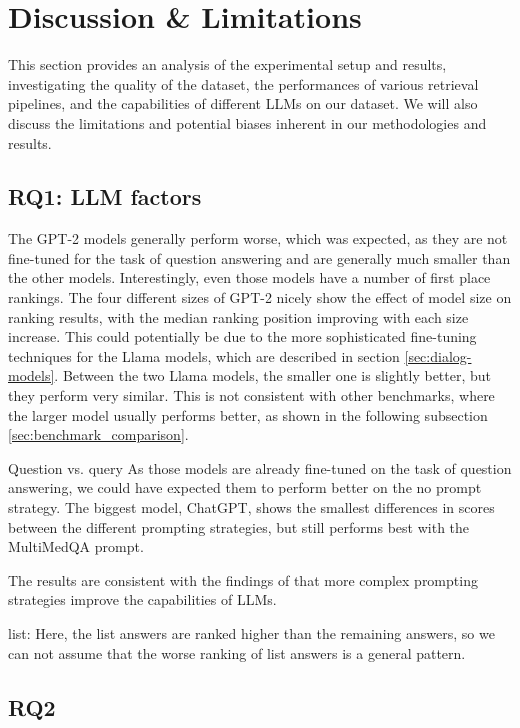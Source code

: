 \chapter{Discussion \& Limitations}\label{discussion}

This section provides an analysis of the experimental setup and results, investigating the quality of the dataset, the performances of various retrieval pipelines, and the capabilities of different LLMs on our dataset.
We will also discuss the limitations and potential biases inherent in our methodologies and results.

\section{RQ1: LLM factors}

The GPT-2 models generally perform worse, which was expected, as they are not fine-tuned for the task of question answering and are generally much smaller than the other models.
Interestingly, even those models have a number of first place rankings.
The four different sizes of GPT-2 nicely show the effect of model size on ranking results, with the median ranking position improving with each size increase.
This could potentially be due to the more sophisticated fine-tuning techniques for the Llama models, which are described in section \ref{sec:dialog-models}.
Between the two Llama models, the smaller one is slightly better, but they perform very similar.
This is not consistent with other benchmarks, where the larger model usually performs better, as shown in the following subsection \ref{sec:benchmark_comparison}.

Question vs. query
As those models are already fine-tuned on the task of question answering, we could have expected them to perform better on the no prompt strategy.
The biggest model, ChatGPT, shows the smallest differences in scores between the different prompting strategies, but still performs best with the MultiMedQA prompt.

The results are consistent with the findings of \cite{reynolds:2021:Prompt} that more complex prompting strategies improve the capabilities of LLMs.

list:
Here, the list answers are ranked higher than the remaining answers, so we can not assume that the worse ranking of list answers is a general pattern.
\section{RQ2}

